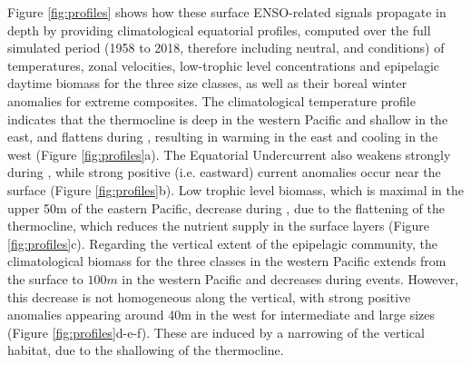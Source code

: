 Figure \ref{fig:profiles} shows how these surface ENSO-related signals propagate in depth by providing climatological equatorial profiles, computed over the full simulated period (1958 to 2018, therefore including neutral, \nino{} and \nina{} conditions) of temperatures, zonal velocities, low-trophic level concentrations and epipelagic daytime biomass for the three size classes, as well as their boreal winter anomalies for extreme \nino{} composites. The climatological temperature profile indicates that the thermocline is deep in the western Pacific and shallow in the east, and flattens during \nino{}, resulting in warming in the east and cooling in the west (Figure  \ref{fig:profiles}a). The Equatorial Undercurrent also weakens strongly during \nino{}, while strong positive (i.e. eastward) current anomalies occur near the surface (Figure  \ref{fig:profiles}b). Low trophic level biomass, which is maximal in the upper 50m of the eastern Pacific, decrease during \nino{}, due to the flattening of the thermocline, which reduces the nutrient supply in the surface layers (Figure \ref{fig:profiles}c). Regarding the vertical extent of the epipelagic community, the climatological biomass for the three classes in the western Pacific extends from the surface to $100m$ in the western Pacific and decreases during \nino{} events. However, this decrease is not homogeneous along the vertical, with strong positive anomalies appearing around 40m in the west for intermediate and large sizes (Figure \ref{fig:profiles}d-e-f). These are induced by a narrowing of the vertical habitat, due to the shallowing of the thermocline. 

